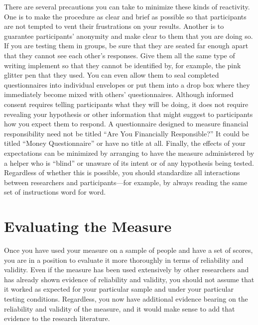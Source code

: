 \documentclass[]{book}
\theoremstyle{definition}
\theoremstyle{definition}
\theoremstyle{remark}
\begin{document}
There are several precautions you can take to minimize these kinds of
reactivity. One is to make the procedure as clear and brief as possible
so that participants are not tempted to vent their frustrations on your
results. Another is to guarantee participants' anonymity and make clear
to them that you are doing so. If you are testing them in groups, be
sure that they are seated far enough apart that they cannot see each
other's responses. Give them all the same type of writing implement so
that they cannot be identified by, for example, the pink glitter pen
that they used. You can even allow them to seal completed questionnaires
into individual envelopes or put them into a drop box where they
immediately become mixed with others' questionnaires. Although informed
consent requires telling participants what they will be doing, it does
not require revealing your hypothesis or other information that might
suggest to participants how you expect them to respond. A questionnaire
designed to measure financial responsibility need not be titled ``Are
You Financially Responsible?'' It could be titled ``Money
Questionnaire'' or have no title at all. Finally, the effects of your
expectations can be minimized by arranging to have the measure
administered by a helper who is ``blind'' or unaware of its intent or of
any hypothesis being tested. Regardless of whether this is possible, you
should standardize all interactions between researchers and
participants---for example, by always reading the same set of
instructions word for word.

\section{Evaluating the Measure}\label{evaluating-the-measure}

Once you have used your measure on a sample of people and have a set of
scores, you are in a position to evaluate it more thoroughly in terms of
reliability and validity. Even if the measure has been used extensively
by other researchers and has already shown evidence of reliability and
validity, you should not assume that it worked as expected for your
particular sample and under your particular testing conditions.
Regardless, you now have additional evidence bearing on the reliability
and validity of the measure, and it would make sense to add that
evidence to the research literature.
\end{document}
